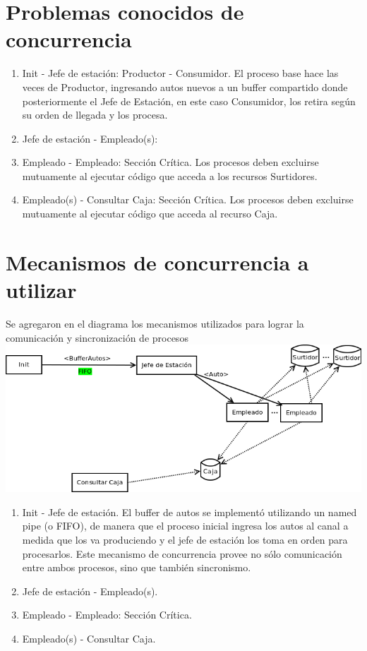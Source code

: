 \documentclass{article}
\begin{document}
\section{Problemas conocidos de concurrencia}
\begin{enumerate}
	\item Init - Jefe de estación: Productor - Consumidor. El proceso base hace las veces de Productor, ingresando autos nuevos a un buffer compartido donde posteriormente el Jefe de Estación, en este caso Consumidor, los retira según su orden de llegada y los procesa.
	\item Jefe de estación - Empleado(s):
	\item Empleado - Empleado: Sección Crítica. Los procesos deben excluirse mutuamente al ejecutar código que acceda a los recursos Surtidores.
	\item Empleado(s) - Consultar Caja: Sección Crítica. Los procesos deben excluirse mutuamente al ejecutar código que acceda al recurso Caja.
\end{enumerate}
\section{Mecanismos de concurrencia a utilizar}
Se agregaron en el diagrama los mecanismos utilizados para lograr la comunicación y sincronización de procesos
\\[1\baselineskip]
\includegraphics[width=\textwidth]{overview+mecanismos}
\begin{enumerate}
        \item Init - Jefe de estación. El buffer de autos se implementó utilizando un named pipe (o FIFO), de manera que el proceso inicial ingresa los autos al canal a medida que los va produciendo y el jefe de estación los toma en orden para procesarlos. Este mecanismo de concurrencia provee no sólo comunicación entre ambos procesos, sino que también sincronismo.
	\item Jefe de estación - Empleado(s).
	\item Empleado - Empleado: Sección Crítica.
	\item Empleado(s) - Consultar Caja.

\end{enumerate}
					
\end{document}
